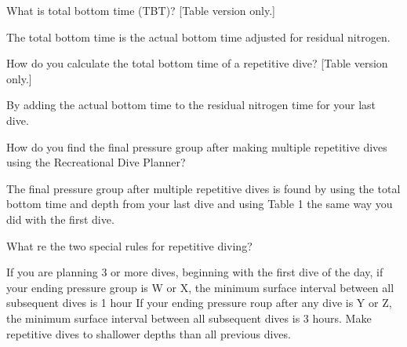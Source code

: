	\begin{qanda}
		\begin{question}
What is total bottom time (TBT)? [Table version only.]
		\end{question}

		\begin{answer}
The total bottom time is the actual bottom time adjusted for residual nitrogen.
		\end{answer}
	\end{qanda}

	\begin{qanda}
		\begin{question}
How do you calculate the total bottom time of a repetitive dive? [Table version only.]
		\end{question}

		\begin{answer}
By adding the actual bottom time to the residual nitrogen time for your last dive.
		\end{answer}
	\end{qanda}

	\begin{qanda}
		\begin{question}
How do you find the final pressure group after making multiple repetitive dives using the Recreational Dive Planner?
		\end{question}

		\begin{answer}
The final pressure group after multiple repetitive dives is found by using the total bottom time and depth from your last dive and using Table 1 the same way you did with the first dive.
		\end{answer}
	\end{qanda}

	\begin{qanda}
		\begin{question}
What re the two special rules for repetitive diving?
		\end{question}

		\begin{answer}
If you are planning 3 or more dives, beginning with the first dive of the day, if your ending pressure group is W or X, the minimum surface interval between all subsequent dives is 1 hour  If your ending pressure roup after any dive is Y or Z, the minimum surface interval between all subsequent dives is 3 hours.  Make repetitive dives to shallower depths than all previous dives.
		\end{answer}
	\end{qanda}

